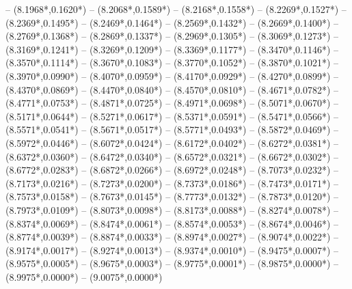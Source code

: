 {	-- ({8.1968*\dx},{0.1620*\dy})
	-- ({8.2068*\dx},{0.1589*\dy})
	-- ({8.2168*\dx},{0.1558*\dy})
	-- ({8.2269*\dx},{0.1527*\dy})
	-- ({8.2369*\dx},{0.1495*\dy})
	-- ({8.2469*\dx},{0.1464*\dy})
	-- ({8.2569*\dx},{0.1432*\dy})
	-- ({8.2669*\dx},{0.1400*\dy})
	-- ({8.2769*\dx},{0.1368*\dy})
	-- ({8.2869*\dx},{0.1337*\dy})
	-- ({8.2969*\dx},{0.1305*\dy})
	-- ({8.3069*\dx},{0.1273*\dy})
	-- ({8.3169*\dx},{0.1241*\dy})
	-- ({8.3269*\dx},{0.1209*\dy})
	-- ({8.3369*\dx},{0.1177*\dy})
	-- ({8.3470*\dx},{0.1146*\dy})
	-- ({8.3570*\dx},{0.1114*\dy})
	-- ({8.3670*\dx},{0.1083*\dy})
	-- ({8.3770*\dx},{0.1052*\dy})
	-- ({8.3870*\dx},{0.1021*\dy})
	-- ({8.3970*\dx},{0.0990*\dy})
	-- ({8.4070*\dx},{0.0959*\dy})
	-- ({8.4170*\dx},{0.0929*\dy})
	-- ({8.4270*\dx},{0.0899*\dy})
	-- ({8.4370*\dx},{0.0869*\dy})
	-- ({8.4470*\dx},{0.0840*\dy})
	-- ({8.4570*\dx},{0.0810*\dy})
	-- ({8.4671*\dx},{0.0782*\dy})
	-- ({8.4771*\dx},{0.0753*\dy})
	-- ({8.4871*\dx},{0.0725*\dy})
	-- ({8.4971*\dx},{0.0698*\dy})
	-- ({8.5071*\dx},{0.0670*\dy})
	-- ({8.5171*\dx},{0.0644*\dy})
	-- ({8.5271*\dx},{0.0617*\dy})
	-- ({8.5371*\dx},{0.0591*\dy})
	-- ({8.5471*\dx},{0.0566*\dy})
	-- ({8.5571*\dx},{0.0541*\dy})
	-- ({8.5671*\dx},{0.0517*\dy})
	-- ({8.5771*\dx},{0.0493*\dy})
	-- ({8.5872*\dx},{0.0469*\dy})
	-- ({8.5972*\dx},{0.0446*\dy})
	-- ({8.6072*\dx},{0.0424*\dy})
	-- ({8.6172*\dx},{0.0402*\dy})
	-- ({8.6272*\dx},{0.0381*\dy})
	-- ({8.6372*\dx},{0.0360*\dy})
	-- ({8.6472*\dx},{0.0340*\dy})
	-- ({8.6572*\dx},{0.0321*\dy})
	-- ({8.6672*\dx},{0.0302*\dy})
	-- ({8.6772*\dx},{0.0283*\dy})
	-- ({8.6872*\dx},{0.0266*\dy})
	-- ({8.6972*\dx},{0.0248*\dy})
	-- ({8.7073*\dx},{0.0232*\dy})
	-- ({8.7173*\dx},{0.0216*\dy})
	-- ({8.7273*\dx},{0.0200*\dy})
	-- ({8.7373*\dx},{0.0186*\dy})
	-- ({8.7473*\dx},{0.0171*\dy})
	-- ({8.7573*\dx},{0.0158*\dy})
	-- ({8.7673*\dx},{0.0145*\dy})
	-- ({8.7773*\dx},{0.0132*\dy})
	-- ({8.7873*\dx},{0.0120*\dy})
	-- ({8.7973*\dx},{0.0109*\dy})
	-- ({8.8073*\dx},{0.0098*\dy})
	-- ({8.8173*\dx},{0.0088*\dy})
	-- ({8.8274*\dx},{0.0078*\dy})
	-- ({8.8374*\dx},{0.0069*\dy})
	-- ({8.8474*\dx},{0.0061*\dy})
	-- ({8.8574*\dx},{0.0053*\dy})
	-- ({8.8674*\dx},{0.0046*\dy})
	-- ({8.8774*\dx},{0.0039*\dy})
	-- ({8.8874*\dx},{0.0033*\dy})
	-- ({8.8974*\dx},{0.0027*\dy})
	-- ({8.9074*\dx},{0.0022*\dy})
	-- ({8.9174*\dx},{0.0017*\dy})
	-- ({8.9274*\dx},{0.0013*\dy})
	-- ({8.9374*\dx},{0.0010*\dy})
	-- ({8.9475*\dx},{0.0007*\dy})
	-- ({8.9575*\dx},{0.0005*\dy})
	-- ({8.9675*\dx},{0.0003*\dy})
	-- ({8.9775*\dx},{0.0001*\dy})
	-- ({8.9875*\dx},{0.0000*\dy})
	-- ({8.9975*\dx},{0.0000*\dy})
	-- ({9.0075*\dx},{0.0000*\dy})
}
